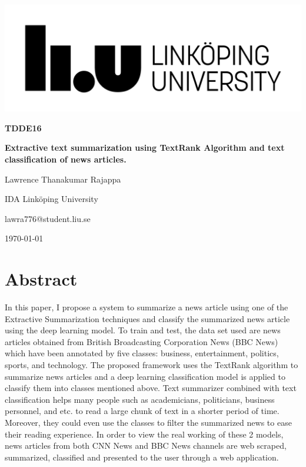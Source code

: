 \documentclass[a4paper,4pt]{article}
\begin{document}
\begin{titlepage}
	\centering
	\includegraphics[width=.6\textwidth]{images/LiU_primary_black.png}\par
	\vfill
	{\scshape\Large \textbf{TDDE16}\par}
	{\huge\bfseries Extractive text summarization using TextRank Algorithm and text classification of news articles.\par}
	\vspace{0.75cm}
    {\large Lawrence Thanakumar Rajappa} \par
    {\large IDA Linköping University} \par
    {\large lawra776@student.liu.se}
	\vfill
	{\large \today\par}
\end{titlepage}
\renewcommand*\contentsname{Table of Contents}
\tableofcontents
\newpage
\listoffigures
\listoftables
{}
\newpage
\newpage
\clearpage
{}
\section{Abstract}
In this paper, I propose a system to summarize a news article using one of the Extractive Summarization techniques and 
classify the summarized news article using the deep learning model. To train and test, the data set used are news articles obtained
from British Broadcasting Corporation News (BBC News) \cite{greene06icml} which have been annotated by five classes: business, 
entertainment, politics, sports, and technology. The proposed framework uses the TextRank algorithm to summarize news articles
and a deep learning classification model is applied to classify them into classes mentioned above. Text summarizer combined 
with text classification helps many people such as academicians, politicians, business personnel, and etc. to read a large
chunk of text in a shorter period of time. Moreover, they could even use the classes to filter the summarized news to ease
their reading experience. In order to view the real working of these 2 models, news articles from both CNN News and 
BBC News channels are web scraped, summarized, classified and presented to the user through a web application.
\end{document}
